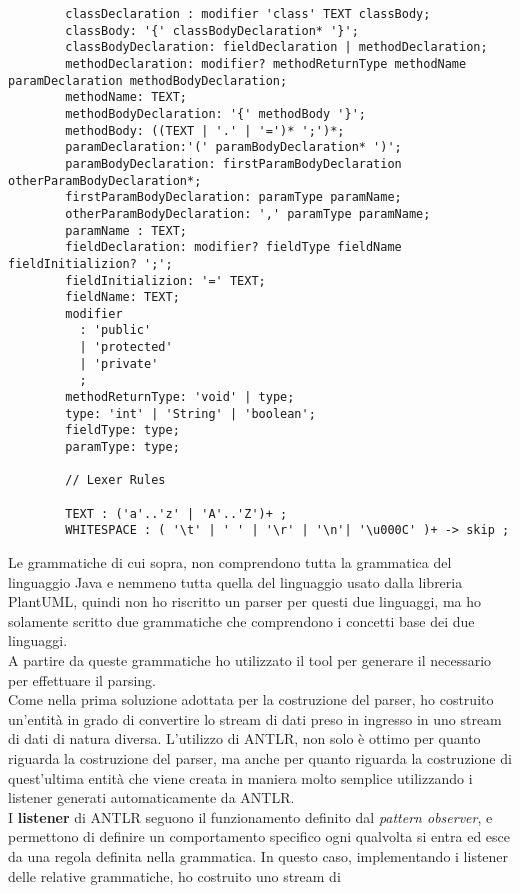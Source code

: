 \documentclass{article}
\begin{document}
\begin{itemize}
\begin{lstlisting}
        classDeclaration : modifier 'class' TEXT classBody;
        classBody: '{' classBodyDeclaration* '}';
        classBodyDeclaration: fieldDeclaration | methodDeclaration;
        methodDeclaration: modifier? methodReturnType methodName paramDeclaration methodBodyDeclaration;
        methodName: TEXT;
        methodBodyDeclaration: '{' methodBody '}';
        methodBody: ((TEXT | '.' | '=')* ';')*;
        paramDeclaration:'(' paramBodyDeclaration* ')';
        paramBodyDeclaration: firstParamBodyDeclaration otherParamBodyDeclaration*;
        firstParamBodyDeclaration: paramType paramName;
        otherParamBodyDeclaration: ',' paramType paramName;
        paramName : TEXT;
        fieldDeclaration: modifier? fieldType fieldName fieldInitializion? ';';
        fieldInitializion: '=' TEXT;
        fieldName: TEXT;
        modifier
          :	'public'
          |	'protected'
          |	'private'
          ;
        methodReturnType: 'void' | type;
        type: 'int' | 'String' | 'boolean';
        fieldType: type;
        paramType: type;

        // Lexer Rules

        TEXT : ('a'..'z' | 'A'..'Z')+ ;
        WHITESPACE : ( '\t' | ' ' | '\r' | '\n'| '\u000C' )+ -> skip ;
      \end{lstlisting}
  \end{itemize}
  Le grammatiche di cui sopra, non comprendono tutta la grammatica del linguaggio Java e nemmeno tutta quella del linguaggio usato dalla libreria PlantUML, quindi non ho riscritto un parser per
  questi due linguaggi, ma ho solamente scritto due grammatiche che comprendono i concetti base dei due linguaggi.
  \\A partire da queste grammatiche ho utilizzato il tool per generare il necessario per effettuare il parsing.\\
  Come nella prima soluzione adottata per la costruzione del parser, ho costruito un'entità in grado di convertire lo stream di dati preso in ingresso
  in uno stream di dati di natura diversa. L'utilizzo di ANTLR, non solo è ottimo per quanto riguarda la costruzione del parser, ma anche per quanto riguarda
  la costruzione di quest'ultima entità che viene creata in maniera molto semplice utilizzando i listener generati automaticamente da ANTLR.\\
  I \textbf{listener} di ANTLR seguono il funzionamento definito dal \textit{pattern observer}, e permettono di definire un comportamento specifico ogni qualvolta si
  entra ed esce da una regola definita nella grammatica. In questo caso, implementando i listener delle relative grammatiche, ho costruito uno stream di
\end{document}
